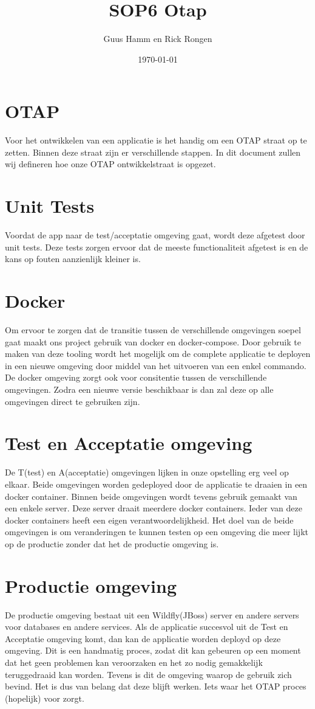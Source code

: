 \documentclass{scrreprt}
\title{SOP6 Otap}
\author{Guus Hamm en Rick Rongen}
\date{\today}
\begin{document}
	\maketitle
	\tableofcontents
	\newpage

	\chapter{OTAP}
    Voor het ontwikkelen van een applicatie is het handig om een OTAP straat op te zetten. Binnen deze straat zijn er verschillende stappen. In dit document zullen wij defineren hoe onze OTAP ontwikkelstraat is opgezet.
    
    \chapter{Unit Tests}
    Voordat de app naar de test/acceptatie omgeving gaat, wordt deze afgetest door unit tests. Deze tests zorgen ervoor dat de meeste functionaliteit afgetest is en de kans op fouten aanzienlijk kleiner is.
    
    \chapter{Docker}
    \label{chap:docker}
    Om ervoor te zorgen dat de transitie tussen de verschillende omgevingen soepel gaat maakt ons project gebruik van docker en docker-compose.
    Door gebruik te maken van deze tooling wordt het mogelijk om de complete applicatie te deployen in een nieuwe omgeving door middel van het uitvoeren van een enkel commando. De docker omgeving zorgt ook voor consitentie tussen de verschillende omgevingen. Zodra een nieuwe versie beschikbaar is dan zal deze op alle omgevingen direct te gebruiken zijn.

	\chapter{Test en Acceptatie omgeving}
    De T(test) en A(acceptatie) omgevingen lijken in onze opstelling erg veel op elkaar. Beide omgevingen worden gedeployed door de applicatie te draaien in een docker container. Binnen beide omgevingen wordt tevens gebruik gemaakt van een enkele server. Deze server draait meerdere docker containers. Ieder van deze docker containers heeft een eigen verantwoordelijkheid. Het doel van de beide omgevingen is om veranderingen te kunnen testen op een omgeving die meer lijkt op de productie zonder dat het de productie omgeving is. 
    
    \chapter{Productie omgeving}
    De productie omgeving bestaat uit een Wildfly(JBoss) server en andere servers voor databases en andere services. Als de applicatie succesvol uit de Test en Acceptatie omgeving komt, dan kan de applicatie worden deployd op deze omgeving. Dit is een handmatig proces, zodat dit kan gebeuren op een moment dat het geen problemen kan veroorzaken en het zo nodig gemakkelijk teruggedraaid kan worden. Tevens is dit de omgeving waarop de gebruik zich bevind. Het is dus van belang dat deze blijft werken. Iets waar het OTAP proces (hopelijk) voor zorgt.
	
\end{document}

